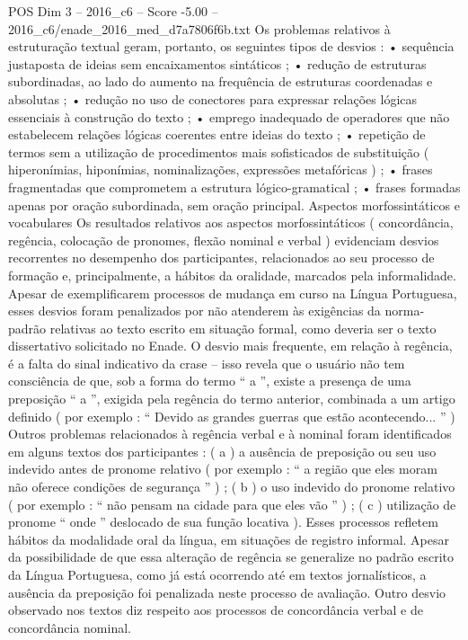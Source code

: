 \begin{textsample}{POS Dim 3 – 2016\_c6 – Score -5.00 – 2016\_c6/enade\_2016\_med\_d7a7806f6b.txt}
Os problemas relativos à estruturação textual geram, portanto, os seguintes tipos de desvios : • sequência justaposta de ideias sem encaixamentos sintáticos ; • redução de estruturas subordinadas, ao lado do aumento na frequência de estruturas coordenadas e absolutas ; • redução no uso de conectores para expressar relações lógicas essenciais à construção do texto ; • emprego inadequado de operadores que não estabelecem relações lógicas coerentes entre ideias do texto ; • repetição de termos sem a utilização de procedimentos mais sofisticados de substituição ( hiperonímias, hiponímias, nominalizações, expressões metafóricas ) ; • frases fragmentadas que comprometem a estrutura lógico-gramatical ; • frases formadas apenas por oração subordinada, sem oração principal.
Aspectos morfossintáticos e vocabulares Os resultados relativos aos aspectos morfossintáticos ( concordância, regência, colocação de pronomes, flexão nominal e verbal ) evidenciam desvios recorrentes no desempenho dos participantes, relacionados ao seu processo de formação e, principalmente, a hábitos da oralidade, marcados pela informalidade.
Apesar de exemplificarem processos de mudança em curso na Língua Portuguesa, esses desvios foram penalizados por não atenderem às exigências da norma-padrão relativas ao texto escrito em situação formal, como deveria ser o texto dissertativo solicitado no Enade.
O desvio mais frequente, em relação à regência, é a falta do sinal indicativo da crase – isso revela que o usuário não tem consciência de que, sob a forma do termo “ a ”, existe a presença de uma preposição “ a ”, exigida pela regência do termo anterior, combinada a um artigo definido ( por exemplo : “ Devido as grandes guerras que estão acontecendo... ” ) Outros problemas relacionados à regência verbal e à nominal foram identificados em alguns textos dos participantes : ( a ) a ausência de preposição ou seu uso indevido antes de pronome relativo ( por exemplo : “ a região que eles moram não oferece condições de segurança ” ) ; ( b ) o uso indevido do pronome relativo ( por exemplo : “ não pensam na cidade para que eles vão ” ) ; ( c ) utilização de pronome “ onde ” deslocado de sua função locativa ).
Esses processos refletem hábitos da modalidade oral da língua, em situações de registro informal.
Apesar da possibilidade de que essa alteração de regência se generalize no padrão escrito da Língua Portuguesa, como já está ocorrendo até em textos jornalísticos, a ausência da preposição foi penalizada neste processo de avaliação.
Outro desvio observado nos textos diz respeito aos processos de concordância verbal e de concordância nominal.

\end{textsample}
